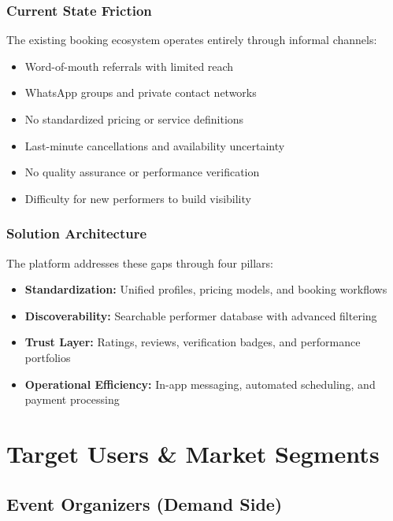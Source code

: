 \documentclass[11pt,a4paper]{article}
\begin{document}
\subsubsection{Current State Friction}
The existing booking ecosystem operates entirely through informal channels:
\begin{itemize}[leftmargin=1.5em]
  \item Word-of-mouth referrals with limited reach
  \item WhatsApp groups and private contact networks
  \item No standardized pricing or service definitions
  \item Last-minute cancellations and availability uncertainty
  \item No quality assurance or performance verification
  \item Difficulty for new performers to build visibility
\end{itemize}

\subsubsection{Solution Architecture}
The platform addresses these gaps through four pillars:

\begin{itemize}[leftmargin=1.5em]
  \item \textbf{Standardization:} Unified profiles, pricing models, and booking
        workflows
  \item \textbf{Discoverability:} Searchable performer database with advanced
        filtering
  \item \textbf{Trust Layer:} Ratings, reviews, verification badges, and
        performance portfolios
  \item \textbf{Operational Efficiency:} In-app messaging, automated scheduling,
        and payment processing
\end{itemize}

\section{Target Users \& Market Segments}

\subsection{Event Organizers (Demand Side)}
\end{document}
